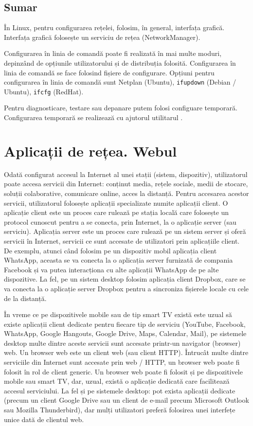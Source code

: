 \subsection{Sumar}
\label{sec:net:linux-config:summary}

În Linux, pentru configurarea rețelei, folosim, în general, interfața grafică.
Interfața grafică folosește un serviciu de rețea (NetworkManager).

Configurarea în linia de comandă poate fi realizată în mai multe moduri, depinzând de opțiunile utilizatorului și de distribuția folosită.
Configurarea în linia de comandă se face folosind fișiere de configurare.
Opțiuni pentru configurarea în linia de comandă sunt Netplan (Ubuntu), \texttt{ifupdown} (Debian / Ubuntu), \texttt{ifcfg} (RedHat).

Pentru diagnosticare, testare sau depanare putem folosi configuare temporară.
Configurarea temporară se realizează cu ajutorul utilitarul .

\section{Aplicații de rețea. Webul}
\label{sec:net:apps}

Odată configurat accesul la Internet al unei stații (sistem, dispozitiv), utilizatorul poate accesa servicii din Internet: conținut media, rețele sociale, medii de stocare, soluții colaborative, comunicare online, acces la distanță.
Pentru accesarea acestor servicii, utilizatorul folosește aplicații specializate numite aplicații client.
O aplicație client este un proces care rulează pe stația locală care folosește un protocol cunoscut pentru a se conecta, prin Internet, la o aplicație server (sau serviciu).
Aplicația server este un proces care rulează pe un sistem server și oferă servicii în Internet, servicii ce sunt accesate de utilizatori prin aplicațiile client.
De exemplu, atunci când folosim pe un dispozitiv mobil aplicația client WhatsApp, aceasta se va conecta la o aplicația server furnizată de compania Facebook și va putea interacționa cu alte aplicații WhatsApp de pe alte dispozitive.
La fel, pe un sistem desktop folosim aplicația client Dropbox, care se va conecta la o aplicație server Dropbox pentru a sincroniza fișierele locale cu cele de la distanță.

În vreme ce pe dispozitivele mobile sau de tip smart TV există este uzual să existe aplicații client dedicate pentru fiecare tip de serviciu (YouTube, Facebook, WhatsApp, Google Hangouts, Google Drive, Maps, Calendar, Mail), pe sistemele desktop multe dintre aceste servicii sunt accesate printr-un navigator (browser) web.
Un browser web este un client web (sau client HTTP).
Întrucât multe dintre serviciile din Internet sunt accesate prin web / HTTP, un browser web poate fi folosit în rol de client generic.
Un browser web poate fi folosit și pe dispozitivele mobile sau smart TV, dar, uzual, există o aplicație dedicată care facilitează accesul serviciului.
La fel și pe sistemele desktop: pot exista aplicații dedicate (precum un client Google Drive sau un client de e-mail precum Microsoft Outlook sau Mozilla Thunderbird), dar mulți utilizatori preferă folosirea unei interfețe unice dată de clientul web.

